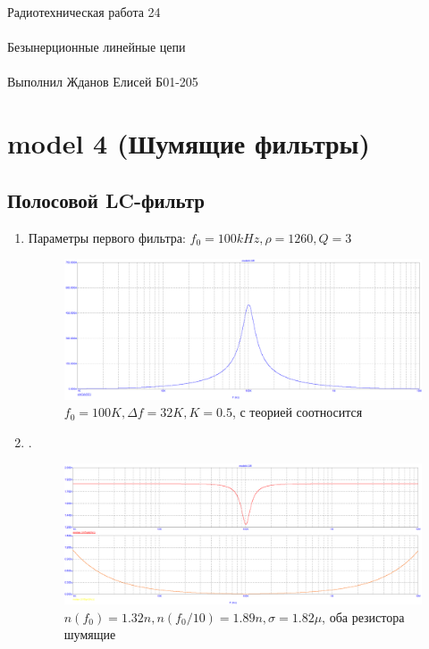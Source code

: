 \documentclass{astroedu-lab}
\begin{document}
\begin{problem}{\huge Радиотехническая работа 24\\\\Безынерционные линейные цепи\\\\Выполнил Жданов Елисей Б01-205}
\begin{enumerate}
\end{enumerate}

\section{\textbf{model 4 (Шумящие фильтры)}}

\subsection*{Полосовой LC-фильтр}

\begin{enumerate}

\item

Параметры первого фильтра: $f_0 = 100 kHz, \rho = 1260, Q = 3$

\begin{figure}[h!]
    \centering
    \includegraphics[scale=0.3]{images/mod4_1_1.png}
    \caption{$f_0 = 100K, \Delta f = 32K, K = 0.5$, с теорией соотносится}
    \label{fig:m411}
\end{figure}

\newpage

\item

.

\begin{figure}[h!]
    \centering
    \includegraphics[scale=0.3]{images/mod4_1_2_1.png}
    \caption{$n(f_0) = 1.32n, n(f_0/10) = 1.89n, \sigma = 1.82\mu$, оба резистора шумящие}
    \label{fig:m4121}
\end{figure}


\end{enumerate}
\end{problem}
\end{document}
